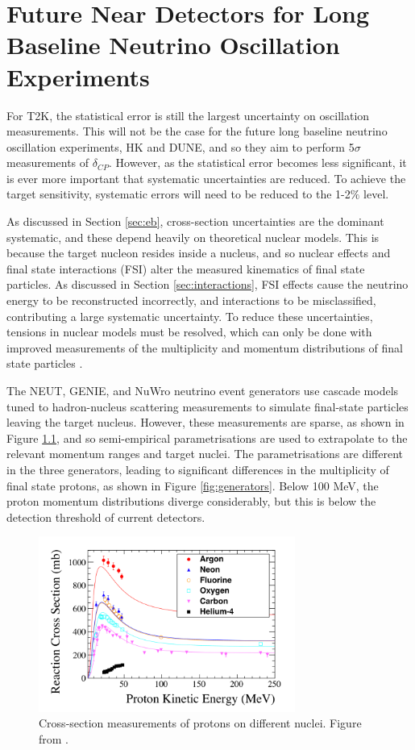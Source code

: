 \chapter{Future Near Detectors for Long Baseline Neutrino Oscillation Experiments}\label{sec:hptpc}

For T2K, the statistical error is still the largest uncertainty on oscillation measurements. This will not be the case for the future long baseline neutrino oscillation experiments, HK and DUNE, and so they aim to perform 5$\sigma$ measurements of $\delta_{CP}$. However, as the statistical error becomes less significant, it is ever more important that systematic uncertainties are reduced. To achieve the target sensitivity, systematic errors will need to be reduced to the 1-2$\%$ level.

As discussed in Section \ref{sec:eb}, cross-section uncertainties are the dominant systematic, and these depend heavily on theoretical nuclear models. This is because the target nucleon resides inside a nucleus, and so nuclear effects and final state interactions (FSI) alter the measured kinematics of final state particles. As discussed in Section \ref{sec:interactions}, FSI effects cause the neutrino energy to be reconstructed incorrectly, and interactions to be misclassified, contributing a large systematic uncertainty. To reduce these uncertainties, tensions in nuclear models must be resolved, which can only be done with improved measurements of the multiplicity and momentum distributions of final state particles \cite{nustecscat}.

The NEUT, GENIE, and NuWro \cite{nuwro} neutrino event generators use cascade models tuned to hadron-nucleus scattering measurements to simulate final-state particles leaving the target nucleus. However, these measurements are sparse, as shown in Figure \ref{fig:nucxsec}, and so semi-empirical parametrisations are used to extrapolate to the relevant momentum ranges and target nuclei. The parametrisations are different in the three generators, leading to significant differences in the multiplicity of final state protons, as shown in Figure \ref{fig:generators}. Below 100 MeV, the proton momentum distributions diverge considerably, but this is below the detection threshold of current detectors.

\begin{figure}
\centering
\includegraphics*[width=0.75\textwidth,clip]{figs/nucxsec}
\caption{Cross-section measurements of protons on different nuclei. Figure from \cite{hptpcprop}.}\label{fig:nucxsec}
\end{figure}

